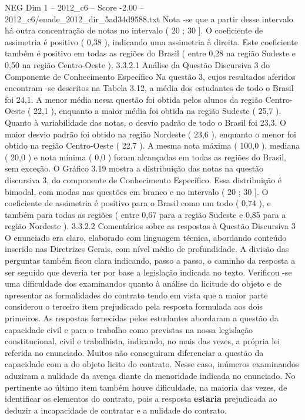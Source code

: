 \begin{textsample}{NEG Dim 1 – 2012\_c6 – Score -2.00 – 2012\_c6/enade\_2012\_dir\_5ad34d9588.txt}
Nota -se que a partir desse intervalo há outra concentração de notas no intervalo ( 20 ; 30 ].
O coeficiente de assimetria é positivo ( 0,38 ), indicando uma assimetria à direita.
Este coeficiente também é positivo em todas as regiões do Brasil ( entre 0,28 na região Sudeste e 0,50 na região Centro-Oeste ). 3.3.2.1 Análise da Questão Discursiva 3 do Componente de Conhecimento Específico Na questão 3, cujos resultados aferidos encontram -se descritos na Tabela 3.12, a média dos estudantes de todo o Brasil foi 24,1.
A menor média nessa questão foi obtida pelos alunos da região Centro-Oeste ( 22,1 ), enquanto a maior média foi obtida na região Sudeste ( 25,7 ).
Quanto à variabilidade das notas, o desvio padrão de todo o Brasil foi 23,3.
O maior desvio padrão foi obtido na região Nordeste ( 23,6 ), enquanto o menor foi obtido na região Centro-Oeste ( 22,7 ).
A mesma nota máxima ( 100,0 ), mediana ( 20,0 ) e nota mínima ( 0,0 ) foram alcançadas em todas as regiões do Brasil, sem exceção.
O Gráfico 3.19 mostra a distribuição das notas na questão discursiva 3, do componente de Conhecimento Específico.
Essa distribuição é bimodal, com modas nas questões em branco e no intervalo ( 20 ; 30 ].
O coeficiente de assimetria é positivo para o Brasil como um todo ( 0,74 ), e também para todas as regiões ( entre 0,67 para a região Sudeste e 0,85 para a região Nordeste ). 3.3.2.2 Comentários sobre as respostas à Questão Discursiva 3 O enunciado era claro, elaborado com linguagem técnica, abordando conteúdo inserido nas Diretrizes Gerais, com nível médio de profundidade.
A divisão das perguntas também ficou clara indicando, passo a passo, o caminho da resposta a ser seguido que deveria ter por base a legislação indicada no texto.
Verificou -se uma dificuldade dos examinandos quanto à análise da licitude do objeto e de apresentar as formalidades do contrato tendo em vista que a maior parte considerou o terceiro item prejudicado pela resposta formulada aos dois primeiros.
As respostas fornecidas pelos estudantes abordaram a questão da capacidade civil e para o trabalho como previstas na nossa legislação constitucional, civil e trabalhista, indicando, no mais das vezes, a própria lei referida no enunciado.
Muitos não conseguiram diferenciar a questão da capacidade com a do objeto licito do contrato.
Nesse caso, inúmeros examinandos aduziram a nulidade da avença diante da menoridade indicada no enunciado.
No pertinente ao último item também houve dificuldade, na maioria das vezes, de identificar os elementos do contrato, pois a resposta \textbf{estaria} prejudicada ao deduzir a incapacidade de contratar e a nulidade do contrato.

\end{textsample}
